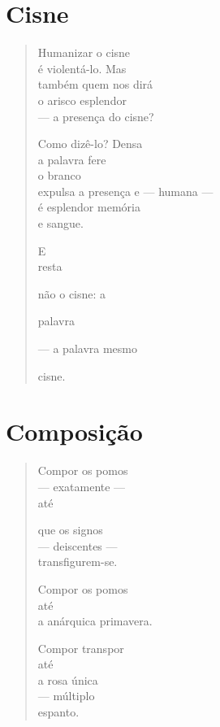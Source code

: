 \chapter{Cisne}

\begin{verse}
Humanizar o cisne\\
é violentá-lo. Mas\\
também quem nos dirá\\
o arisco esplendor\\
--- a presença do cisne?

Como dizê-lo? Densa\\
a palavra fere\\
o branco\\
expulsa a presença e --- humana ---\\
é esplendor memória\\
\qquad\qquad\qquad e sangue.

\qquad\qquad\qquad E\\
\qquad\qquad\qquad resta

não o cisne: a

\qquad\qquad\qquad palavra

--- a palavra mesmo

\qquad\qquad\qquad cisne.
\end{verse}

\chapter{Composição}

\begin{verse}
Compor os pomos\\
\qquad\qquad\qquad --- exatamente ---\\
\qquad\qquad\qquad\qquad\qquad\qquad até

que os signos\\
\qquad\qquad\qquad --- deiscentes ---\\
\qquad\qquad\qquad\qquad\qquad\qquad transfigurem-se.

Compor os pomos\\
\qquad\qquad\qquad\qquad até\\
a anárquica primavera.

Compor \qquad transpor\\
\quad até\\
a rosa única\\
--- múltiplo\\
\quad espanto.
\end{verse}

